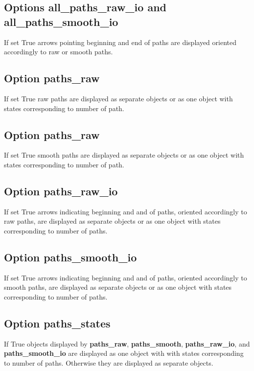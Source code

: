 \documentclass[a4paper,10pt,english]{sphinxmanual}
\begin{document}
\subsection{Options \textbf{all\_paths\_raw\_io} and \textbf{all\_paths\_smooth\_io}}
\label{valve/valve_config:options-all-paths-raw-io-and-all-paths-smooth-io}
If set True arrows pointing beginning and end of paths are displayed oriented accordingly to raw or smooth paths.


\subsection{Option \textbf{paths\_raw}}
\label{valve/valve_config:option-paths-raw}
If set True raw paths are displayed as separate objects or as one object with states corresponding to number of path.


\subsection{Option \textbf{paths\_raw}}
\label{valve/valve_config:id1}
If set True smooth paths are displayed as separate objects or as one object with states corresponding to number of path.


\subsection{Option \textbf{paths\_raw\_io}}
\label{valve/valve_config:option-paths-raw-io}
If set True arrows indicating beginning and and of paths, oriented accordingly to raw paths, are displayed as separate objects or as one object with states corresponding to number of paths.


\subsection{Option \textbf{paths\_smooth\_io}}
\label{valve/valve_config:option-paths-smooth-io}
If set True arrows indicating beginning and and of paths, oriented accordingly to smooth paths, are displayed as separate objects or as one object with states corresponding to number of paths.


\subsection{Option \textbf{paths\_states}}
\label{valve/valve_config:option-paths-states}
If True objects displayed by \textbf{paths\_raw}, \textbf{paths\_smooth}, \textbf{paths\_raw\_io}, and \textbf{paths\_smooth\_io} are displayed as one object with with states corresponding to number of paths. Otherwise they are displayed as separate objects.
\end{document}
